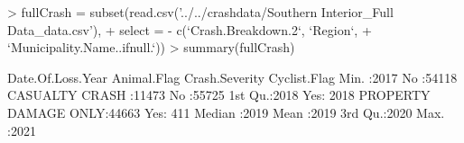 \documentclass[11pt, a4paper]{article}
\begin{document}
\begin{Schunk}
\begin{Sinput}
> fullCrash = subset(read.csv('../../crashdata/Southern Interior_Full Data_data.csv'), 
+           select = - c(`Crash.Breakdown.2`, `Region`,
+                        `Municipality.Name..ifnull.`))
> summary(fullCrash)
\end{Sinput}
\begin{Soutput}
 Date.Of.Loss.Year Animal.Flag              Crash.Severity  Cyclist.Flag
 Min.   :2017      No :54118   CASUALTY CRASH      :11473   No :55725   
 1st Qu.:2018      Yes: 2018   PROPERTY DAMAGE ONLY:44663   Yes:  411   
 Median :2019                                                           
 Mean   :2019                                                           
 3rd Qu.:2020                                                           
 Max.   :2021                                                           
                                                                        

\end{Soutput}
\end{Schunk}
\end{document}
